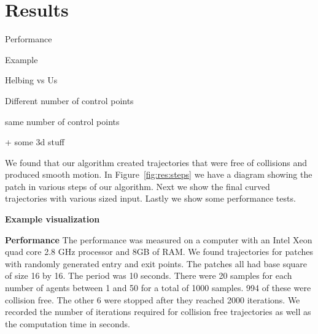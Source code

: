 \section{Results}
\label{sec:results}

Performance

Example

Helbing vs Us

Different number of control points

same number of control points

+ some 3d stuff



We found that our algorithm created trajectories that were free of collisions and produced smooth motion. In Figure~\ref{fig:res:steps} we have a diagram showing the patch in various steps of our algorithm. Next we show the final curved trajectories with various sized input. Lastly we show some performance tests.


\textbf{Example visualization}



\textbf{Performance}
The performance was measured on a computer with an Intel Xeon quad core 2.8 GHz processor and 8GB of RAM. We found trajectories for patches with randomly generated entry and exit points. The patches all had base square of size 16 by 16. The period was 10 seconds. There were 20 samples for each number of agents between 1 and 50 for a total of 1000 samples. 994 of these were collision free. The other 6 were stopped after they reached 2000 iterations. We recorded the number of iterations required for collision free trajectories as well as the computation time in seconds.


